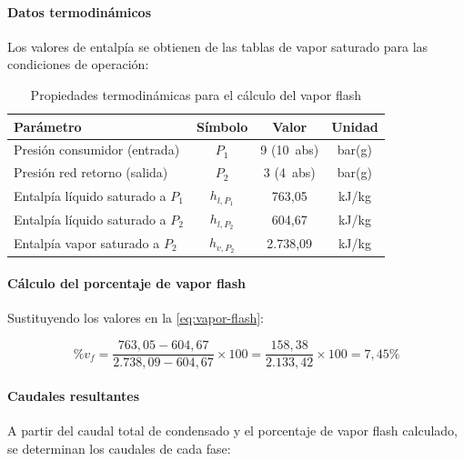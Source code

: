 \paragraph{Datos termodinámicos}

Los valores de entalpía se obtienen de las tablas de vapor saturado para las condiciones de operación:

\begin{table}[H]
	\centering
	\caption{Propiedades termodinámicas para el cálculo del vapor flash}
	\label{tab:propiedades-flash}
	\begin{tabular}{lccc}
		\toprule
		\textbf{Parámetro}                & \textbf{Símbolo} & \textbf{Valor} & \textbf{Unidad} \\
		\midrule
		Presión consumidor (entrada)      & $P_1$            & 9 (10~abs)     & bar(g)          \\
		Presión red retorno (salida)      & $P_2$            & 3 (4~abs)      & bar(g)          \\
		Entalpía líquido saturado a $P_1$ & $h_{l,P_1}$      & 763{,}05       & kJ/kg           \\
		Entalpía líquido saturado a $P_2$ & $h_{l,P_2}$      & 604{,}67       & kJ/kg           \\
		Entalpía vapor saturado a $P_2$   & $h_{v,P_2}$      & 2.738{,}09     & kJ/kg           \\
		\bottomrule
	\end{tabular}
\end{table}

\paragraph{Cálculo del porcentaje de vapor flash}

Sustituyendo los valores en la \autoref{eq:vapor-flash}:

\begin{equation}
	\%v_f = \frac{763{,}05 - 604{,}67}{2.738{,}09 - 604{,}67} \times 100 = \frac{158{,}38}{2.133{,}42} \times 100 = 7{,}45\%
	\label{eq:vapor-flash-resultado}
\end{equation}

\paragraph{Caudales resultantes}

A partir del caudal total de condensado y el porcentaje de vapor flash calculado, se determinan los caudales de cada fase:

